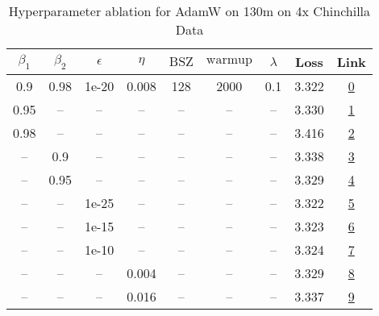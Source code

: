 \begin{table}[H]
\centering
\caption{Hyperparameter ablation for AdamW on 130m on 4x Chinchilla Data}
\label{tab:ablation_adamw_130m_4}
\begin{tabular}{ccccccccc}
\toprule
$\beta_1$ & $\beta_2$ & $\epsilon$ & $\eta$ & $\mathrm{BSZ}$ & $\mathrm{warmup}$ & $\lambda$ & Loss & Link \\
\midrule
0.9 & 0.98 & 1e-20 & 0.008 & 128 & 2000 & 0.1 & 3.322 & \href{https://wandb.ai/stanford-mercury/optimizer-scaling/runs/sweep-130m-10B-adamw28a1ddlr0.008-wd0.1-minlr0-warmup2000-b10.9--a5a31c}{0} \\
\midrule
0.95 & -- & -- & -- & -- & -- & -- & 3.330 & \href{https://wandb.ai/stanford-mercury/optimizer-scaling/runs/sweep-130m-10B-adamw3cefb4lr0.008-wd0.1-minlr0-warmup2000-b10.95-d2de07}{1} \\
0.98 & -- & -- & -- & -- & -- & -- & 3.416 & \href{https://wandb.ai/stanford-mercury/optimizer-scaling/runs/sweep-130m-10B-adamwdec095lr0.008-wd0.1-minlr0-warmup2000-b10.98-5164f7}{2} \\
-- & 0.9 & -- & -- & -- & -- & -- & 3.338 & \href{https://wandb.ai/stanford-mercury/optimizer-scaling/runs/sweep-130m-10B-adamw50c768lr0.008-wd0.1-minlr0-warmup2000-b10.9--374622}{3} \\
-- & 0.95 & -- & -- & -- & -- & -- & 3.329 & \href{https://wandb.ai/stanford-mercury/optimizer-scaling/runs/sweep-130m-10B-adamw41da7flr0.008-wd0.1-minlr0-warmup2000-b10.9--e79638}{4} \\
-- & -- & 1e-25 & -- & -- & -- & -- & 3.322 & \href{https://wandb.ai/stanford-mercury/optimizer-scaling/runs/sweep-130m-10B-adamw11bb27lr0.008-wd0.1-minlr0-warmup2000-b10.9--112190}{5} \\
-- & -- & 1e-15 & -- & -- & -- & -- & 3.323 & \href{https://wandb.ai/stanford-mercury/optimizer-scaling/runs/sweep-130m-10B-adamw2151b5lr0.008-wd0.1-minlr0-warmup2000-b10.9--8b96e9}{6} \\
-- & -- & 1e-10 & -- & -- & -- & -- & 3.324 & \href{https://wandb.ai/stanford-mercury/optimizer-scaling/runs/sweep-130m-10B-adamwc59aaalr0.008-wd0.1-minlr0-warmup2000-b10.9--64f3e7}{7} \\
-- & -- & -- & 0.004 & -- & -- & -- & 3.329 & \href{https://wandb.ai/stanford-mercury/optimizer-scaling/runs/sweep-130m-10B-adamw05a8e1lr0.004-wd0.1-minlr0-warmup2000-b10.9--765ae0}{8} \\
-- & -- & -- & 0.016 & -- & -- & -- & 3.337 & \href{https://wandb.ai/stanford-mercury/optimizer-scaling/runs/sweep-130m-10B-adamwdc4f18lr0.016-wd0.1-minlr0-warmup2000-b10.9--5e227e}{9} \\

\end{tabular}
\end{table}
